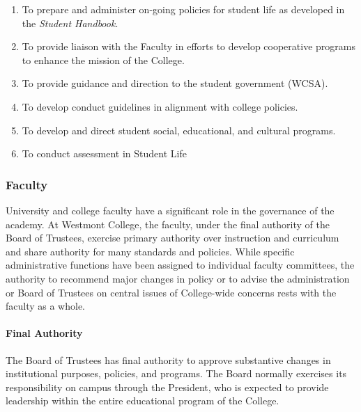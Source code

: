\begin{enumerate}
{\begin{enumerate}
{\begin{enumerate}
										\item{To prepare and administer on-going policies for student life as developed in the \emph{Student Handbook}.}
										\item{To provide liaison with the Faculty in efforts to develop cooperative programs to enhance the mission of the College.}
										\item{To provide guidance and direction to the student government (WCSA).}
										\item{To develop conduct guidelines in alignment with college policies.}
										\item{To develop and direct student social, educational, and cultural programs.}
										\item{To conduct assessment in Student Life}
									\end{enumerate}
								}
							\end{enumerate}
						}
					\end{enumerate}

		\subsubsection{Faculty}
			\label{sec:CollegeOrganization-Faculty}

			University and college faculty have a significant role in the
			governance of the academy. At Westmont College, the faculty, under
			the final authority of the Board of Trustees, exercise primary
			authority over instruction and curriculum and share authority for
			many standards and policies.  While specific administrative
			functions have been assigned to individual faculty committees, the
			authority to recommend major changes in policy or to advise the
			administration or Board of Trustees on central issues of
			College-wide concerns rests with the faculty as a whole.

			\paragraph{Final Authority}

				The Board of Trustees has final authority to approve substantive changes in institutional purposes, policies, and programs.  The Board normally exercises its responsibility on campus through the President, who is expected to provide leadership within the entire educational program of the College.

